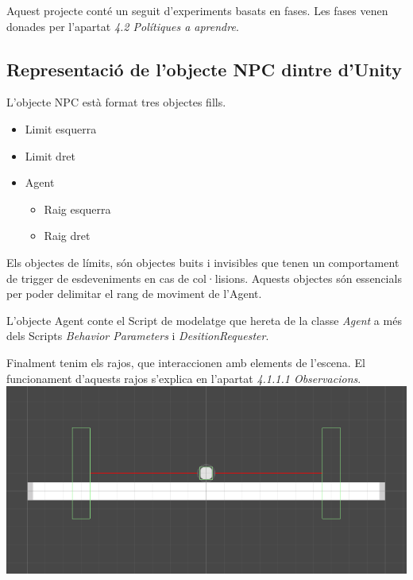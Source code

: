 \documentclass{article}
\begin{document}
    Aquest projecte conté un seguit d'experiments basats en fases.
    Les fases venen donades per l'apartat \textit{4.2 Polítiques a aprendre}.
    
    \subsection{ Representació de l'objecte NPC dintre d'Unity }
    L'objecte NPC està format tres objectes fills.
    
    \begin{itemize}
        \item Limit esquerra
        \item Limit dret
        \item Agent
        \begin{itemize}
            \item Raig esquerra
            \item Raig dret
        \end{itemize}
    \end{itemize}

    Els objectes de límits, són objectes buits i invisibles que tenen un comportament de trigger de esdeveniments en cas de col·lisions. Aquests objectes són essencials per poder delimitar el rang de moviment de l'Agent.

    L'objecte Agent conte el Script de modelatge que hereta de la classe \textit{Agent} a més dels Scripts \textit{Behavior Parameters} i \textit{DesitionRequester}.
    
    Finalment tenim els rajos, que interaccionen amb elements de l'escena. El funcionament d'aquests rajos s'explica en l'apartat \textit{4.1.1.1 Observacions}. \\
    
    \includegraphics[width=\textwidth]{images/NPC_scene.png} 
    
    \newpage
\end{document}
